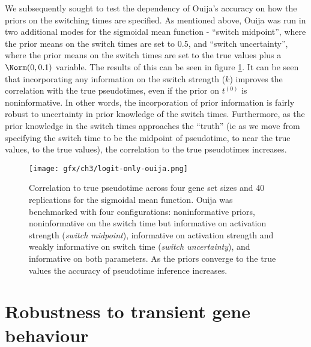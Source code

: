 We subsequently sought to test the dependency of Ouija's accuracy on how the priors on the switching times are specified. As mentioned above, Ouija was run in two additional modes for the sigmoidal mean function - ``switch midpoint'', where the prior means on the switch times are set to 0.5, and ``switch uncertainty'', where the prior means on the switch times are set to the true values plus a $\Norm(0, 0.1)$ variable. The results of this can be seen in figure \ref{fig:ouija_only}. It can be seen that incorporating any information on the switch strength ($k$) improves the correlation with the true pseudotimes, even if the prior on $t^{(0)}$ is noninformative. In other words, the incorporation of prior information is fairly robust to uncertainty in prior knowledge of the switch times. Furthermore, as the prior knowledge in the switch times approaches the ``truth'' (ie as we move from specifying the switch time to be the midpoint of pseudotime, to near the true values, to the true values), the correlation to the true pseudotimes increases.


\begin{figure}%
	\centering
	\texttt{[image: gfx/ch3/logit-only-ouija.png]}
	\caption{Correlation to true pseudotime across four gene set sizes and 40 replications for the sigmoidal mean function. Ouija was benchmarked with four configurations: noninformative priors, noninformative on the switch time but informative on activation strength (\emph{switch midpoint}), informative on activation strength and weakly informative on switch time (\emph{switch uncertainty}), and informative on both parameters. As the priors converge to the true values the accuracy of pseudotime inference increases.}
	\label{fig:ouija_only}
\end{figure}

\section{Robustness to transient gene behaviour}

